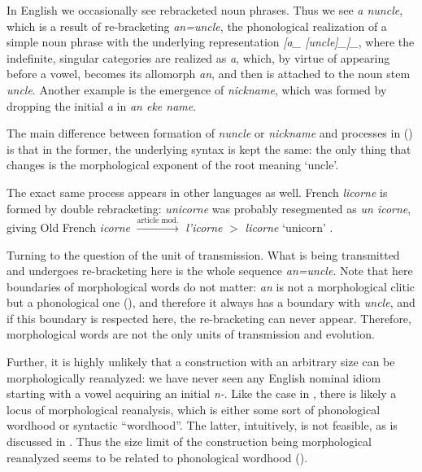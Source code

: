 \documentclass[a4paper, oneside, scheme=plain, 12pt]{article}
\newcommand*{\citepage}[1]{p.~{#1}}
\newcommand{\form}[1]{\emph{#1}}
\newcommand*{\textgt}{$>$ }
\newcommand{\translate}[1]{`#1'}
\newcommand*{\category}[1]{\textsc{#1}}
\begin{document}
In English we occasionally see rebracketed noun phrases.
Thus we see \form{a nuncle}, which is a result of re-bracketing \form{an=uncle},
the phonological realization of a simple noun phrase with the underlying representation
\form{[a_{\text{\category{singular,indefinite}}} [uncle]_{\text{noun stem}}]_{\text{noun phrase}}},
where the indefinite, singular categories are realized as \form{a},
which, by virtue of appearing before a vowel, becomes its allomorph \form{an},
and then is attached to the noun stem \form{uncle}.
Another example is the emergence of \form{nickname},
which was formed by dropping the initial \form{a} in \form{an eke name}.

The main difference between formation of \form{nuncle} or \form{nickname}
and processes in ()
is that in the former, the underlying syntax is kept the same:
the only thing that changes is the morphological exponent of the root meaning \translate{uncle}.

The exact same process appears in other languages as well.
French \form{licorne} is formed by double rebracketing:
\form{unicorne} was probably resegmented as \form{un icorne},
giving Old French \form{icorne} $\stackrel{\text{article mod.}}{\longrightarrow}$ \form{l'icorne} \textgt \form{licorne} \translate{unicorn}
\citep[\citepage{305}]{alkire2010romance}.

Turning to the question of the unit of transmission.
What is being transmitted and undergoes re-bracketing here is the whole sequence \form{an=uncle}.
Note that here boundaries of morphological words do not matter:
\form{an} is not a morphological clitic but a phonological one (),
and therefore it always has a boundary with \form{uncle},
and if this boundary is respected here, the re-bracketing can never appear.
Therefore, morphological words are not the only units of transmission and evolution.

Further, it is highly unlikely that a construction with an arbitrary size can be morphologically reanalyzed:
we have never seen any English nominal idiom starting with a vowel acquiring an initial \form{n-}.
Like the case in ,
there is likely a locus of morphological reanalysis,
which is either some sort of phonological wordhood or syntactic ``wordhood''.
The latter, intuitively, is not feasible, as is discussed in .
Thus the size limit of the construction being morphological reanalyzed seems to be related to phonological wordhood ().
\end{document}
